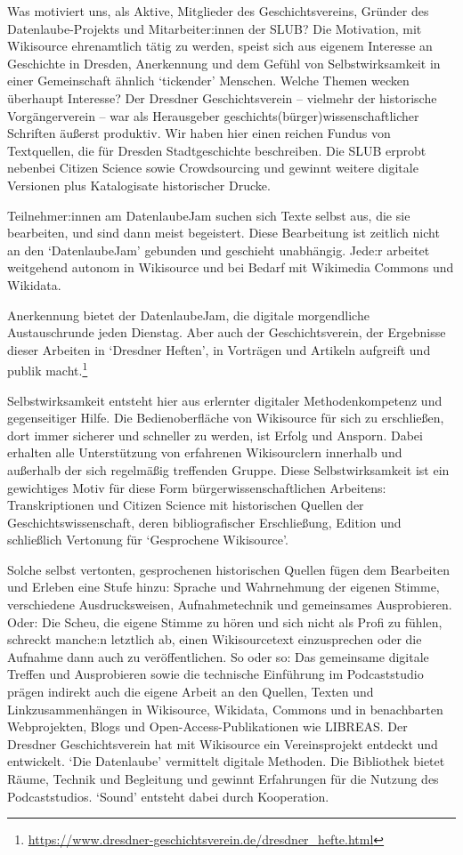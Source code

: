 \documentclass[a4paper,
fontsize=11pt,
oneside,
numbers=noperiodatend,
parskip=half-,
bibliography=totoc,
final
]{scrartcl}
\begin{document}
Was motiviert uns, als Aktive, Mitglieder des Geschichtsvereins, Gründer
des Datenlaube-Pro\-jekts und Mitarbeiter:innen der SLUB? Die Motivation,
mit Wikisource ehrenamtlich tätig zu werden, speist sich aus eigenem
Interesse an Geschichte in Dresden, Anerkennung und dem Gefühl von
Selbstwirksamkeit in einer Gemeinschaft ähnlich \enquote*{tickender}
Menschen. Welche Themen wecken überhaupt Interesse? Der Dresdner
Geschichtsverein -- vielmehr der historische Vorgängerverein -- war als
Herausgeber geschichts(bürger)wissenschaftlicher Schriften äußerst
produktiv. Wir haben hier einen reichen Fundus von Textquellen, die für
Dresden Stadtgeschichte beschreiben. Die SLUB erprobt nebenbei Citizen
Science sowie Crowdsourcing und gewinnt weitere digitale Versionen plus
Katalogisate historischer Drucke.

Teilnehmer:innen am DatenlaubeJam suchen sich Texte selbst aus, die sie
bearbeiten, und sind dann meist begeistert. Diese Bearbeitung ist
zeitlich nicht an den \enquote*{DatenlaubeJam} gebunden und geschieht
unabhängig. Jede:r arbeitet weitgehend autonom in Wikisource und bei
Bedarf mit Wikimedia Commons und Wikidata.

Anerkennung bietet der DatenlaubeJam, die digitale morgendliche
Austauschrunde jeden Dienstag. Aber auch der Geschichtsverein, der
Ergebnisse dieser Arbeiten in \enquote*{Dresdner Heften}, in Vorträgen
und Artikeln aufgreift und publik macht.\footnote{\url{https://www.dresdner-geschichtsverein.de/dresdner_hefte.html}}

Selbstwirksamkeit entsteht hier aus erlernter digitaler
Methodenkompetenz und gegenseitiger Hilfe. Die Bedienoberfläche von
Wikisource für sich zu erschließen, dort immer sicherer und schneller zu
werden, ist Erfolg und Ansporn. Dabei erhalten alle Unterstützung von
erfahrenen Wikisourclern innerhalb und außerhalb der sich regelmäßig
treffenden Gruppe. Diese Selbstwirksamkeit ist ein gewichtiges Motiv für
diese Form bürgerwissenschaftlichen Arbeitens: Transkriptionen und
Citizen Science mit historischen Quellen der Geschichtswissenschaft,
deren bibliografischer Erschließung, Edition und schließlich Vertonung
für \enquote*{Gesprochene Wikisource}.

Solche selbst vertonten, gesprochenen historischen Quellen fügen dem
Bearbeiten und Erleben eine Stufe hinzu: Sprache und Wahrnehmung der
eigenen Stimme, verschiedene Ausdrucksweisen, Aufnahmetechnik und
gemeinsames Ausprobieren. Oder: Die Scheu, die eigene Stimme zu hören
und sich nicht als Profi zu fühlen, schreckt manche:n letztlich ab,
einen Wikisourcetext einzusprechen oder die Aufnahme dann auch zu
veröffentlichen. So oder so: Das gemeinsame digitale Treffen und
Ausprobieren sowie die technische Einführung im Podcaststudio prägen
indirekt auch die eigene Arbeit an den Quellen, Texten und
Linkzusammenhängen in Wikisource, Wikidata, Commons und in benachbarten
Webprojekten, Blogs und Open-Access-Publikationen wie LIBREAS. Der
Dresdner Geschichtsverein hat mit Wikisource ein Vereinsprojekt entdeckt
und entwickelt. \enquote*{Die Datenlaube} vermittelt digitale Methoden.
Die Bibliothek bietet Räume, Technik und Begleitung und gewinnt
Erfahrungen für die Nutzung des Podcaststudios. \enquote*{Sound}
entsteht dabei durch Kooperation.
\end{document}
